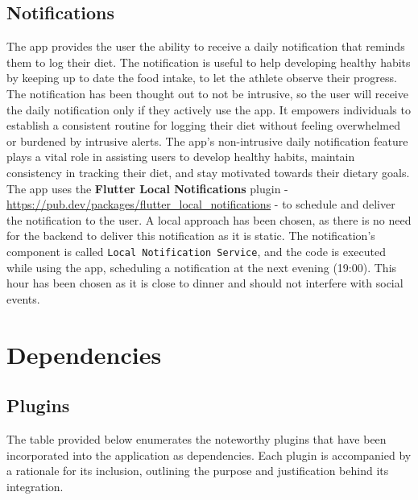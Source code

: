 \documentclass{Configuration_Files/PoliMi3i_thesis}
\begin{document}
\section{Notifications}
The app provides the user the ability to receive a daily notification that reminds them to log their diet. The notification is useful to help developing healthy habits by keeping up to date the food intake, to let the athlete observe their progress. 
The notification has been thought out to not be intrusive, so the user will receive the daily notification only if they actively use the app. It empowers individuals to establish a consistent routine for logging their diet without feeling overwhelmed or burdened by intrusive alerts.
The app's non-intrusive daily notification feature plays a vital role in assisting users to develop healthy habits, maintain consistency in tracking their diet, and stay motivated towards their dietary goals.
The app uses the \textbf{Flutter Local Notifications} plugin - \url{https://pub.dev/packages/flutter_local_notifications} - to schedule and deliver the notification to the user. 
A local approach has been chosen, as there is no need for the backend to deliver this notification as it is static. 
The notification's component is called \texttt{Local Notification Service}, and the code is executed while using the app, scheduling a notification at the next evening (19:00). This hour has been chosen as it is close to dinner and should not interfere with social events. 

\chapter{Dependencies}
\section{Plugins}
The table provided below enumerates the noteworthy plugins that have been incorporated into the application as dependencies. Each plugin is accompanied by a rationale for its inclusion, outlining the purpose and justification behind its integration.
\end{document}
